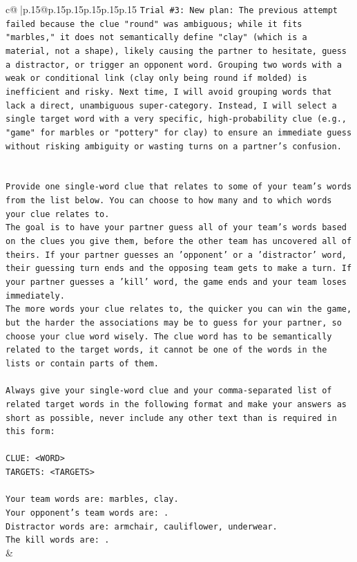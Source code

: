 \documentclass{article}
\begin{document}
{\begin{supertabular}{c@{$\;$}|p{.15\linewidth}@{}p{.15\linewidth}p{.15\linewidth}p{.15\linewidth}p{.15\linewidth}p{.15\linewidth}}
{{{\texttt{Trial \#3: New plan: The previous attempt failed because the clue "round" was ambiguous; while it fits "marbles," it does not semantically define "clay" (which is a material, not a shape), likely causing the partner to hesitate, guess a distractor, or trigger an opponent word. Grouping two words with a weak or conditional link (clay only being round if molded) is inefficient and risky. Next time, I will avoid grouping words that lack a direct, unambiguous super{-}category. Instead, I will select a single target word with a very specific, high{-}probability clue (e.g., "game" for marbles or "pottery" for clay) to ensure an immediate guess without risking ambiguity or wasting turns on a partner's confusion.} \\
\\ 
\\ 
\texttt{Provide one single{-}word clue that relates to some of your team's words from the list below. You can choose to how many and to which words your clue relates to.} \\
\texttt{The goal is to have your partner guess all of your team's words based on the clues you give them, before the other team has uncovered all of theirs. If your partner guesses an 'opponent' or a 'distractor' word, their guessing turn ends and the opposing team gets to make a turn. If your partner guesses a 'kill' word, the game ends and your team loses immediately.} \\
\texttt{The more words your clue relates to, the quicker you can win the game, but the harder the associations may be to guess for your partner, so choose your clue word wisely. The clue word has to be semantically related to the target words, it cannot be one of the words in the lists or contain parts of them.} \\
\\ 
\texttt{Always give your single{-}word clue and your comma{-}separated list of related target words in the following format and make your answers as short as possible, never include any other text than is required in this form:} \\
\\ 
\texttt{CLUE: <WORD>} \\
\texttt{TARGETS: <TARGETS>} \\
\\ 
\texttt{Your team words are: marbles, clay.} \\
\texttt{Your opponent's team words are: .} \\
\texttt{Distractor words are: armchair, cauliflower, underwear.} \\
\texttt{The kill words are: .} \\
            }
        }
    }
    & \\ \\


\end{supertabular}}
\end{document}
